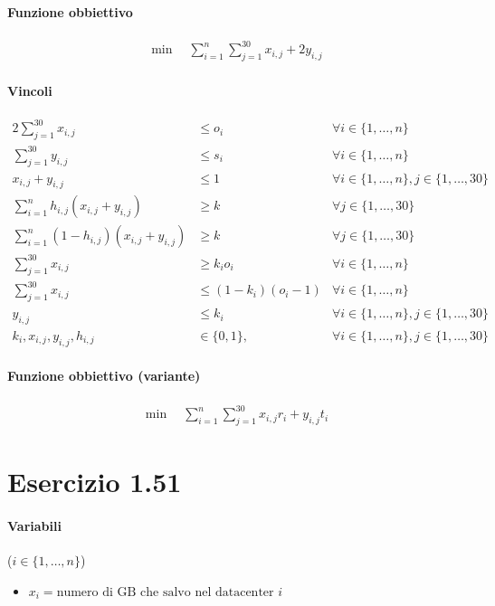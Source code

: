 \documentclass{article}
\begin{document}
\paragraph{Funzione obbiettivo}
\begin{align*}
  \min \quad \sum_{i=1}^n \sum_{j=1}^{30} x_{i,j} + 2y_{i,j}
\end{align*}

\paragraph{Vincoli}
\begin{alignat}{2}
  \sum_{j=1}^{30} x_{i,j} &\leq o_i &\forall i \in \{1,\ldots,n\}\\
  \sum_{j=1}^{30} y_{i,j} &\leq s_i &\forall i \in \{1,\ldots,n\}\\
  x_{i,j} + y_{i,j} &\leq 1 &\forall i \in \{1,\ldots,n\}, j \in \{1,\ldots,30\}\\
  \sum_{i=1}^n h_{i,j}(x_{i,j} + y_{i,j}) &\geq k &\forall j \in \{1,\ldots,30\}\\
  \sum_{i=1}^n (1-h_{i,j})(x_{i,j} + y_{i,j}) &\geq k &\forall j \in \{1,\ldots,30\}\\
  \sum_{j=1}^{30} x_{i,j} &\geq k_i o_i &\forall i \in \{1,\ldots,n\}\\
  \sum_{j=1}^{30} x_{i,j} &\leq (1-k_i) (o_i-1) &\forall i \in \{1,\ldots,n\}\\
  y_{i,j} &\leq k_{i} &\forall i \in \{1,\ldots,n\}, j \in \{1,\ldots,30\}\\
  k_i, x_{i,j}, y_{i,j}, h_{i,j} &\in \{0,1\}, \quad &\forall i \in \{1,\ldots,n\}, j \in \{1,\ldots,30\}
\end{alignat}

\paragraph{Funzione obbiettivo (variante)}
\begin{align*}
  \min \quad \sum_{i=1}^n \sum_{j=1}^{30} x_{i,j}r_i + y_{i,j}t_i
\end{align*}

\pagebreak
\section{Esercizio 1.51}

\paragraph{Variabili} ($i \in \{1,\ldots,n\}$)
\begin{itemize}
  \item $x_i = \text{numero di GB che salvo nel datacenter }i$
\end{itemize}
\end{document}
